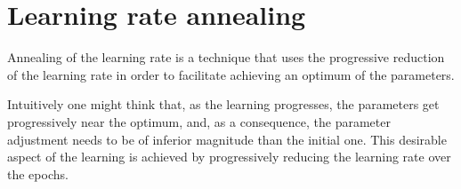 \section{Learning rate annealing}

Annealing of the learning rate is a technique that uses the progressive reduction
of the learning rate in order to facilitate achieving an optimum of the parameters.

Intuitively one might think that, as the learning progresses, the parameters 
get progressively near the optimum, and, as a consequence, 
the parameter adjustment needs to be of inferior magnitude than the initial one.
This desirable aspect of the learning is achieved by progressively reducing the
learning rate over the epochs.



